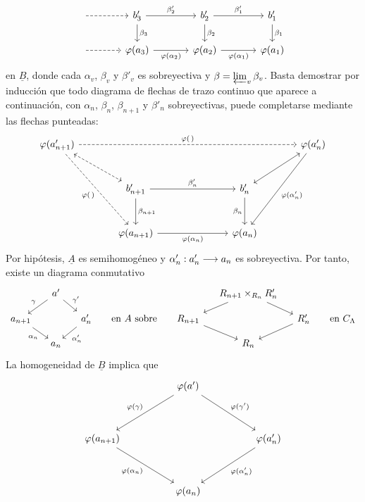 \[
\begin{tikzcd}[column sep=large]
 {} \arrow[r,dashed] & b'_3 \arrow[r,"{\beta'_2}"] \arrow[d,"{\beta_3}"]
 & b'_2 \arrow[r,"{\beta'_1}"] \arrow[d,"{\beta_2}"]
 & b'_1 \arrow[d,"{\beta_1}"]\\
 {} \arrow[r,dashed] & \varphi(a_3) \arrow[r,"{\varphi(\alpha_2)}"']
 & \varphi(a_2) \arrow[r,"{\varphi(\alpha_1)}"']
 & \varphi(a_1)
\end{tikzcd}
\]
en $\underline B$, donde cada $\alpha_v$, $\beta_v$ y
$\beta'_v$ es sobreyectiva y
$\beta=\varprojlim_v\beta_v$. Basta demostrar por inducción que
todo diagrama de flechas de trazo continuo que aparece a
continuación, con
$\alpha_n$, $\beta_n$, $\beta_{n+1}$ y $\beta'_n$
sobreyectivas, puede completarse mediante las flechas punteadas:
\[
\begin{tikzcd}[column sep=large,row sep=large]
 \varphi(a'_{n+1})
   \arrow[rrrr,dashed,"{\varphi(\,)}"]
   \arrow[dr,dashed,leftrightarrow]
   \arrow[ddr,dashed,"{\varphi(\,)}"']
 &&&& \varphi(a'_n)
   \arrow[dl,leftrightarrow]
   \arrow[ddl,"{\varphi(\alpha'_n)}"]\\
 & b'_{n+1} \arrow[rr,"{\beta'_n}"] \arrow[d,"{\beta_{n+1}}"]
 && b'_n \arrow[d,"{\beta_n}"'] &\\
 & \varphi(a_{n+1}) \arrow[rr,"{\varphi(\alpha_n)}"']
 && \varphi(a_n) &
\end{tikzcd}
\]
Por hipótesis, $\underline A$ es semihomogéneo y
$\sisi{\alpha_n}{\alpha'_n}:a'_{n}\longrightarrow a_n$ es sobreyectiva. Por tanto,
existe un diagrama conmutativo
\[
\begin{tikzcd}[column sep=small,row sep=small]
 & a' \arrow[dl,"{\gamma}"'] \arrow[dr,"{\gamma'}"] &
 &&& R_{n+1}\times_{R_n}R'_n \arrow[dl] \arrow[dr] &\\
 a_{n+1} \arrow[dr,"{\alpha_n}"'] &&
 a'_n \arrow[dl,"{\alpha'_n}"]
 & \text{en $\underline A$ sobre} &
 R_{n+1} \arrow[dr] && R'_n \arrow[dl]
 & \text{en $\underline C_\Lambda$}\\
 & a_n &&&& R_n &&
\end{tikzcd}
\]
La homogeneidad de $\underline B$ implica que
\[
\begin{tikzcd}[column sep=huge,row sep=huge]
 & \varphi(a') \arrow[dl,"{\varphi(\gamma)}"']
                  \arrow[dr,"{\varphi(\gamma')}"] &\\
 \varphi(a_{n+1}) \arrow[dr,"{\varphi(\alpha_n)}"']
 && \varphi(a'_n) \arrow[dl,"{\varphi(\alpha'_n)}"]\\
 & \varphi(a_n) &
\end{tikzcd}
\]

